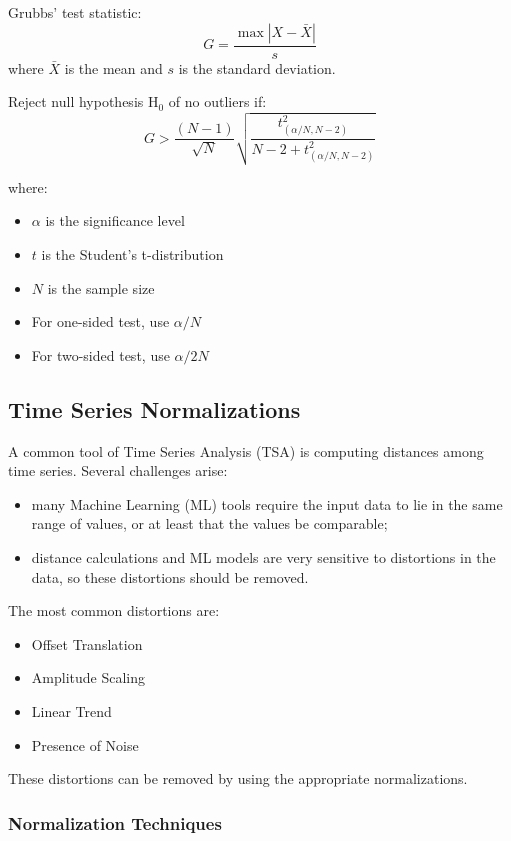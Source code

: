 Grubbs' test statistic: 
\begin{equation}
G = \frac{\max|X - \bar{X}|}{s}
\end{equation}
where $\bar{X}$ is the mean and $s$ is the standard deviation.

Reject null hypothesis H$_0$ of no outliers if:
\begin{equation}
G > \frac{(N-1)}{\sqrt{N}} \sqrt{\frac{t^2_{(\alpha/N, N-2)}}{N-2+t^2_{(\alpha/N, N-2)}}}
\end{equation}

where:
\begin{itemize}
    \item $\alpha$ is the significance level
    \item $t$ is the Student's t-distribution
    \item $N$ is the sample size
    \item For one-sided test, use $\alpha/N$
    \item For two-sided test, use $\alpha/2N$
\end{itemize}

\subsection{Time Series Normalizations}

A common tool of Time Series Analysis (TSA) is computing distances among time series. Several challenges arise:
\begin{itemize}
    \item many Machine Learning (ML) tools require the input data to lie in the same range of values, or at least that the values be comparable;
    \item distance calculations and ML models are very sensitive to distortions in the data, so these distortions should be removed.
\end{itemize}

The most common distortions are:
\begin{itemize}
    \item Offset Translation
    \item Amplitude Scaling
    \item Linear Trend
    \item Presence of Noise
\end{itemize}

These distortions can be removed by using the appropriate normalizations.

\subsubsection{Normalization Techniques}

